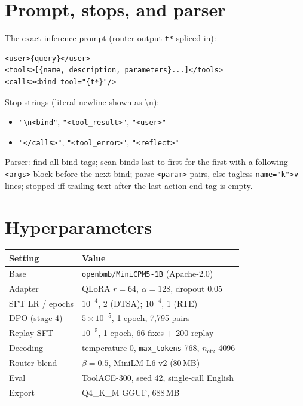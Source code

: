 \documentclass[11pt]{article}
\newcommand{\code}[1]{\texttt{#1}}
\begin{document}
\section{Prompt, stops, and parser}
\label{app:prompt}

The exact inference prompt (router output \code{t*} spliced in):
\begin{lstlisting}
<user>{query}</user>
<tools>[{name, description, parameters}...]</tools>
<calls><bind tool="{t*}"/>
\end{lstlisting}
Stop strings (literal newline shown as \textbackslash n):
\begin{itemize}
  \setlength{\itemsep}{0pt}
  \item \code{"\textbackslash n<bind"}, \code{"<tool\_result>"},
    \code{"<user>"}
  \item \code{"</calls>"}, \code{"<tool\_error>"},
    \code{"<reflect>"}
\end{itemize}
Parser: find all bind tags; scan binds last-to-first for the first
with a following \code{<args>} block before the next bind; parse
\code{<param>} pairs, else tagless \code{name="k">v} lines; stopped
iff trailing text after the last action-end tag is empty.

\section{Hyperparameters}
\label{app:hyper}

\vspace{1em}
\begin{center}
\begin{tabular}{ll}
  \toprule
  Setting & Value \\
  \midrule
  Base & \code{openbmb/MiniCPM5-1B} (Apache-2.0) \\
  Adapter & QLoRA $r{=}64$, $\alpha{=}128$, dropout 0.05 \\
  SFT LR / epochs & $10^{-4}$, 2 (DTSA); $10^{-4}$, 1 (RTE) \\
  DPO (stage 4) & $5{\times}10^{-5}$, 1 epoch, 7,795 pairs \\
  Replay SFT & $10^{-5}$, 1 epoch, 66 fixes $+$ 200 replay \\
  Decoding & temperature 0, \code{max\_tokens} 768, $n_{\mathrm{ctx}}$ 4096 \\
  Router blend & $\beta = 0.5$, MiniLM-L6-v2 (80\,MB) \\
  Eval & ToolACE-300, seed 42, single-call English \\
  Export & Q4\_K\_M GGUF, 688\,MB \\
  \bottomrule
\end{tabular}
\end{center}
\end{document}
